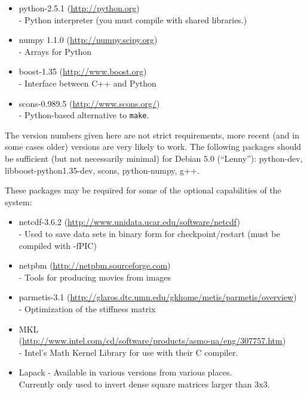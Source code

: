 \begin{itemize}
 \item python-2.5.1 (\url{http://python.org}) \\-
        Python interpreter (you must compile with shared libraries.)
 \item numpy 1.1.0 (\url{http://numpy.scipy.org}) \\-
        Arrays for Python
 \item boost-1.35 (\url{http://www.boost.org}) \\-
        Interface between C++ and Python
 \item scons-0.989.5 (\url{http://www.scons.org/}) \\-
        Python-based alternative to \texttt{make}.
\end{itemize}

The version numbers given here are not strict requirements, more recent (and in some cases older) versions are very likely to work.
The following packages should be sufficient (but not necessarily minimal) for Debian 5.0 (``Lenny''):
python-dev, libboost-python1.35-dev, scons, python-numpy, g++.

These packages may be required for some of the optional capabilities of the system:

\begin{itemize}
 \item netcdf-3.6.2 (\url{http://www.unidata.ucar.edu/software/netcdf}) \\-
        Used to save data sets in binary form for checkpoint/restart (must be compiled with -fPIC)
 \item netpbm (\url{http://netpbm.sourceforge.com}) \\-
        Tools for producing movies from images
 \item parmetis-3.1 (\url{http://glaros.dtc.umn.edu/gkhome/metis/parmetis/overview}) \\-
        Optimization of the stiffness matrix
 \item MKL \\(\url{http://www.intel.com/cd/software/products/asmo-na/eng/307757.htm}) \\-
        Intel's Math Kernel Library for use with their C compiler.
\item Lapack - Available in various versions from various places. \\ 
Currently only used to invert dense square matrices larger than 3x3. 
\end{itemize}

